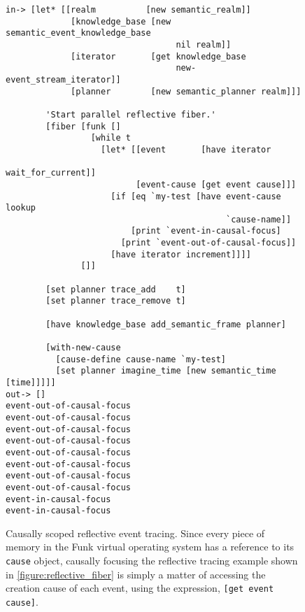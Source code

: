 \begin{figure}[h]
\centering
{\small
\begin{Verbatim}[frame=single]
 in-> [let* [[realm          [new semantic_realm]]
             [knowledge_base [new semantic_event_knowledge_base
                                  nil realm]]
             [iterator       [get knowledge_base
                                  new-event_stream_iterator]]
             [planner        [new semantic_planner realm]]]

        'Start parallel reflective fiber.'
        [fiber [funk []
                 [while t
                   [let* [[event       [have iterator
                                             wait_for_current]]
                          [event-cause [get event cause]]]
                     [if [eq `my-test [have event-cause lookup
                                            `cause-name]]
                         [print `event-in-causal-focus]
                       [print `event-out-of-causal-focus]]
                     [have iterator increment]]]]
               []]
        
        [set planner trace_add    t]
        [set planner trace_remove t]
        
        [have knowledge_base add_semantic_frame planner]
        
        [with-new-cause
          [cause-define cause-name `my-test]
          [set planner imagine_time [new semantic_time [time]]]]]
out-> []
event-out-of-causal-focus
event-out-of-causal-focus
event-out-of-causal-focus
event-out-of-causal-focus
event-out-of-causal-focus
event-out-of-causal-focus
event-out-of-causal-focus
event-out-of-causal-focus
event-in-causal-focus
event-in-causal-focus
\end{Verbatim}
}
\caption[Causally scoped reflective event tracing.]{Causally scoped
  reflective event tracing.  Since every piece of memory in the Funk
  virtual operating system has a reference to its {\tt{cause}} object,
  causally focusing the reflective tracing example shown in
  {\mbox{\autoref{figure:reflective_fiber}}} is simply a matter of
  accessing the creation cause of each event, using the expression,
  {\tt{[get event cause]}}.}
\label{figure:reflective_event_causal_tracing}
\end{figure}
